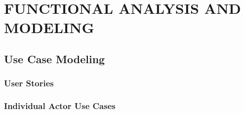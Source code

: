 \chapter{FUNCTIONAL ANALYSIS AND MODELING}


\section{Use Case Modeling}
\subsection{User Stories}
\subsection{Individual Actor Use Cases}
